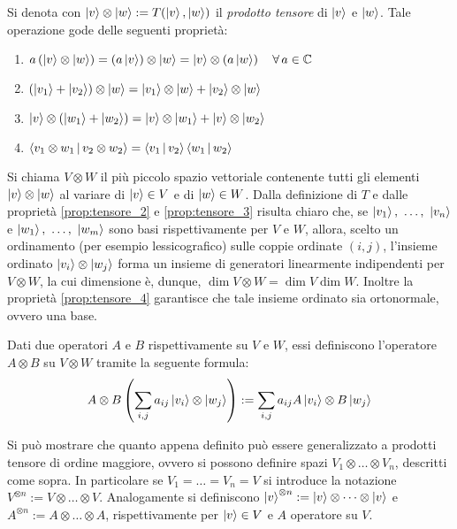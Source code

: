 Si denota con $\ket{v} \otimes \ket{w} := T(\ket{v},\ket{w})$ il \textit{prodotto tensore} di $\ket{v}$ e $\ket{w}$. Tale operazione gode delle seguenti proprietà:
\begin{enumerate}
 \item\label{prop:tensore_1} $a\left(\ket{v} \otimes \ket{w}\right) = \left(a\ket{v}\right) \otimes \ket{w} = \ket{v} \otimes \left(a \ket{w} \right) \quad \forall \, a \in \mathbb{C}^{}$
 \item\label{prop:tensore_2} $\left(\ket{v_1} + \ket{v_2} \right) \otimes \ket{w} = \ket{v_1} \otimes \ket{w} + \ket{v_2} \otimes \ket{w}$
 \item\label{prop:tensore_3} $\ket{v} \otimes \left(\ket{w_1} + \ket{w_2} \right) = \ket{v} \otimes \ket{w_1} + \ket{v} \otimes \ket{w_2}$
 \item\label{prop:tensore_4} $\braket{v_1 \otimes w_1\,}{\, v_2 \otimes w_2} = \braket{v_1\,}{\, v_2}\braket{w_1\,}{\, w_2}$
\end{enumerate}
Si chiama $V \otimes W$ il più piccolo spazio vettoriale contenente tutti gli elementi $\ket{v} \otimes \ket{w}$ al variare di $\ket{v} \in V$ e di $\ket{w} \in W$. Dalla definizione di $T$ e dalle proprietà \ref{prop:tensore_2} e \ref{prop:tensore_3} risulta chiaro che, se $\ket{v_1} ,\ \dots,\ \ket{v_n}$ e $\ket{w_1} ,\ \dots,\ \ket{w_m}$ sono basi rispettivamente per $V$ e $W$, allora, scelto un ordinamento (per esempio lessicografico) sulle coppie ordinate $\left(i,j\right)$, l'insieme ordinato $\ket{v_i} \otimes \ket{w_j}$ forma un insieme di generatori linearmente indipendenti per $V \otimes W$, la cui dimensione è, dunque, $\dim{V \otimes W} = \dim{V} \dim{W}$. Inoltre la proprietà \ref{prop:tensore_4} garantisce che tale insieme ordinato sia ortonormale, ovvero una base.

Dati due operatori $A$ e $B$ rispettivamente su $V$ e $W$, essi definiscono l'operatore $A \otimes B$ su $V \otimes W$ tramite la seguente formula:
\begin{align*}
 A \otimes B \left(\sum_{i,j} a_{ij} \ket{v_i} \otimes \ket{w_j} \right) := \sum_{i,j} a_{ij} A\ket{v_i}\otimes B\ket{w_j}
\end{align*}

Si può mostrare che quanto appena definito può essere generalizzato a prodotti tensore di ordine maggiore, ovvero si possono definire spazi $V_1 \otimes \dots \otimes V_n$, descritti come sopra.
In particolare se $V_1 = \dots = V_n = V$ si introduce la notazione $V^{\otimes n} := V \otimes \dots \otimes V$.
Analogamente si definiscono $\ket{v}^{\otimes n} := \ket{v} \otimes \dots \otimes \ket{v}$ e $A^{\otimes n} := A \otimes \dots \otimes A$, rispettivamente per $\ket{v} \in V$ e $A$ operatore su $V$.

